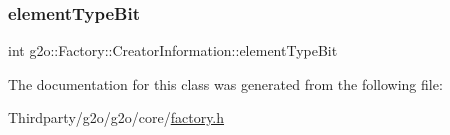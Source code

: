 \mbox{\label{classg2o_1_1_factory_1_1_creator_information_ab9fa4c8aec27d204f5ae6a7510c4e339}} 
\subsubsection{\texorpdfstring{element\+Type\+Bit}{elementTypeBit}}
{\footnotesize\ttfamily int g2o\+::\+Factory\+::\+Creator\+Information\+::element\+Type\+Bit}



The documentation for this class was generated from the following file\+:\begin{DoxyCompactItemize}
\item 
Thirdparty/g2o/g2o/core/\mbox{\hyperlink{factory_8h}{factory.\+h}}\end{DoxyCompactItemize}
